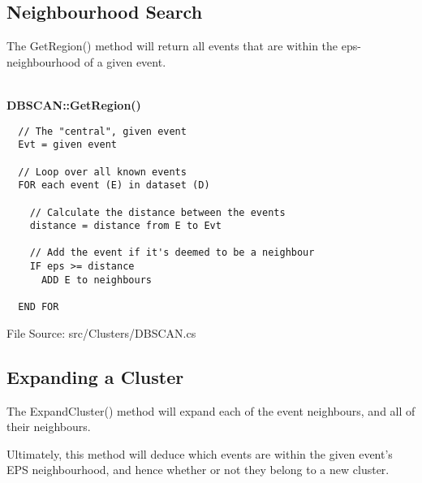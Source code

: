 \subsection{Neighbourhood Search}
The {\ttfamily GetRegion()} method will return all events that are within the 
eps-neighbourhood of a given event.

~\\
{\bfseries DBSCAN::GetRegion()}
\lstset{style=pseudocode}
\begin{lstlisting}
  // The "central", given event
  Evt = given event
  
  // Loop over all known events
  FOR each event (E) in dataset (D)

    // Calculate the distance between the events
    distance = distance from E to Evt

    // Add the event if it's deemed to be a neighbour
    IF eps >= distance
      ADD E to neighbours

  END FOR
\end{lstlisting}
{\textsf \footnotesize File Source: src/Clusters/DBSCAN.cs }


\subsection{Expanding a Cluster}
The {\ttfamily ExpandCluster()} method will expand each of the event 
neighbours, and all of their neighbours. 

Ultimately, this method will deduce which events are within the given event's 
EPS neighbourhood, and hence whether or not they belong to a new cluster.

